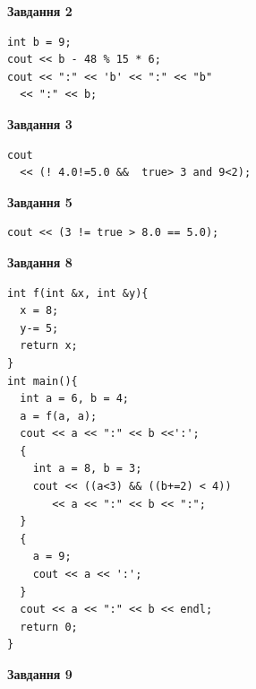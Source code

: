 \documentclass[12pt, ukrainian]{article}
\begin{document}
{\begin {large}
\begin{minipage}[t]{7.0cm}
\end{minipage}
\vline \hspace{1mm}
\begin{minipage}[t]{11.0cm}

\begin{center}
\textbf{Завдання 2}
\end{center}
\vspace{-8mm}

\begin{verbatim}
int b = 9;
cout << b - 48 % 15 * 6;
cout << ":" << 'b' << ":" << "b" 
  << ":" << b;
\end{verbatim}



\begin{center}
\textbf{Завдання 3}
\end{center}
\vspace{-8mm}

\begin{verbatim}
cout 
  << (! 4.0!=5.0 &&  true> 3 and 9<2);
\end{verbatim}



\begin{center}
\textbf{Завдання 5}
\end{center}
\vspace{-8mm}

\begin{verbatim}
cout << (3 != true > 8.0 == 5.0);
\end{verbatim}



\begin{center}
\textbf{Завдання 8}
\end{center}
\vspace{-8mm}

\begin{verbatim}
int f(int &x, int &y){
  x = 8;
  y-= 5;
  return x;
}
int main(){
  int a = 6, b = 4;
  a = f(a, a);
  cout << a << ":" << b <<':';
  {
    int a = 8, b = 3;
    cout << ((a<3) && ((b+=2) < 4))
       << a << ":" << b << ":";
  }
  {
    a = 9;
    cout << a << ':';
  }
  cout << a << ":" << b << endl;
  return 0;
}
\end{verbatim}

\end{minipage}


\begin{minipage}[t]{7.0cm}

\begin{center}
\textbf{Завдання 9}
\end{center}
\vspace{-8mm}


\end{minipage}
\end{large}}
\end{document}
